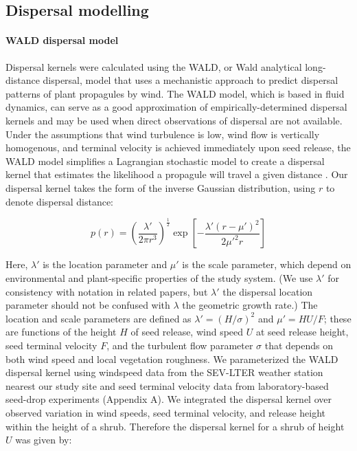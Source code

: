 \documentclass[11pt]{article}\usepackage[]{graphicx}\usepackage[usenames,dvipsnames]{xcolor}
\begin{document}
\subsection*{Dispersal modelling}
\paragraph{WALD dispersal model}
Dispersal kernels were calculated using the WALD, or Wald analytical long-distance dispersal, model that uses a mechanistic approach to predict dispersal patterns of plant propagules by wind.
The WALD model, which is based in fluid dynamics, can serve as a good approximation of empirically-determined dispersal kernels \citep{katul2005mechanistic, skarpaas2007dispersal} and may be used when direct observations of dispersal are not available. 
Under the assumptions that wind turbulence is low, wind flow is vertically homogenous, and terminal velocity is achieved immediately upon seed release, the WALD model simplifies a Lagrangian stochastic model to create a dispersal kernel that estimates the likelihood a propagule will travel a given distance \citep{katul2005mechanistic}.
Our dispersal kernel takes the form of the inverse Gaussian distribution, using $r$ to denote dispersal distance:

\begin{linenomath*} \begin{equation} p(r) = \left(\frac{\lambda'}{2 \pi r^3}\right)^\frac{1}{2} \exp\left[-\frac{\lambda'(r - \mu')^2}{2 \mu'^2 r}\right] \end{equation} \end{linenomath*} 

Here, $\lambda'$ is the location parameter and $\mu'$ is the scale parameter, which depend on environmental and plant-specific properties of the study system. 
(We use $\lambda'$ for consistency with notation in related papers, but $\lambda'$ the dispersal location parameter should not be confused with $\lambda$ the geometric growth rate.)
The location and scale parameters are defined as $\lambda' = (H/\sigma)^2$ and $\mu' = HU/F$; these are functions of the height $H$ of seed release, wind speed $U$ at seed release height, seed terminal velocity $F$, and the turbulent flow parameter $\sigma$ that depends on both wind speed and local vegetation roughness. 
We parameterized the WALD dispersal kernel using windspeed data from the SEV-LTER weather station nearest our study site \citep{SEVmet} and seed terminal velocity data from laboratory-based seed-drop experiments (Appendix A). 
We integrated the dispersal kernel over observed variation in wind speeds, seed terminal velocity, and release height within the height of a shrub.
Therefore the dispersal kernel for a shrub of height $U$ was given by:
\end{document}
